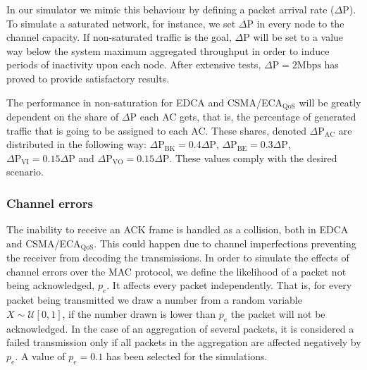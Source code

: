 In our simulator we mimic this behaviour by defining a packet arrival rate ($\Delta\text{P}$). To simulate a saturated network, for instance, we set $\Delta\text{P}$ in every node to the channel capacity. If non-saturated traffic is the goal, $\Delta\text{P}$ will be set to a value way below the system maximum aggregated throughput in order to induce periods of inactivity upon each node. After extensive tests, $\Delta\text{P}=2\text{Mbps}$ has proved to provide satisfactory results.

The performance in non-saturation for EDCA and CSMA/ECA$_{\text{QoS}}$ will be greatly dependent on the share of $\Delta\text{P}$ each AC gets, that is, the percentage of generated traffic that is going to be assigned to each AC. These shares, denoted $\Delta\text{P}_{\text{AC}}$ are distributed in the following way: $\Delta\text{P}_{\text{BK}}=0.4\Delta\text{P}$, $\Delta\text{P}_{\text{BE}}=0.3\Delta\text{P}$, $\Delta\text{P}_{\text{VI}}=0.15\Delta\text{P}$ and $\Delta\text{P}_{\text{VO}}=0.15\Delta\text{P}$. These values comply with the desired scenario.

	
\subsubsection{Channel errors}
The inability to receive an ACK frame is handled as a collision, both in EDCA and CSMA/ECA$_{\text{QoS}}$. This could happen due to channel imperfections preventing the receiver from decoding the transmissions. In order to simulate the effects of channel errors over the MAC protocol, we define the likelihood of a packet not being acknowledged, $p_e$. It affects every packet independently. That is, for every packet being transmitted we draw a number from a random variable $X\sim\mathcal{U}[0,1]$, if the number drawn is lower than $p_e$ the packet will not be acknowledged. In the case of an aggregation of several packets, it is considered a failed transmission only if all packets in the aggregation are affected negatively by $p_e$. A value of $p_e=0.1$ has been selected for the simulations.

